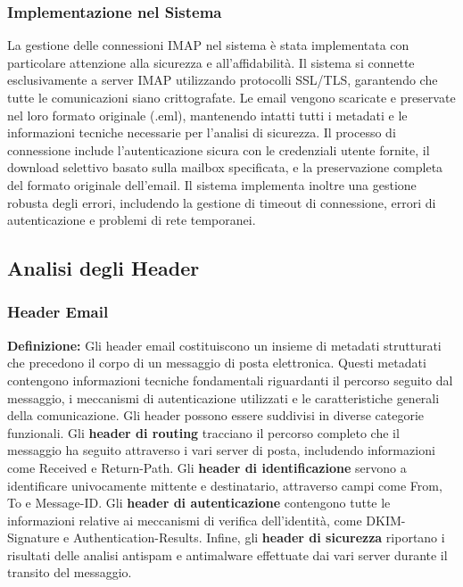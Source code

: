 \documentclass{article}
\begin{document}
\subsubsection{Implementazione nel Sistema}
La gestione delle connessioni IMAP nel sistema è stata implementata con particolare attenzione alla sicurezza e all'affidabilità. Il sistema si connette esclusivamente a server IMAP utilizzando protocolli SSL/TLS, garantendo che tutte le comunicazioni siano crittografate. Le email vengono scaricate e preservate nel loro formato originale (.eml), mantenendo intatti tutti i metadati e le informazioni tecniche necessarie per l'analisi di sicurezza.
\newline\newline
Il processo di connessione include l'autenticazione sicura con le credenziali utente fornite, il download selettivo basato sulla mailbox specificata, e la preservazione completa del formato originale dell'email. Il sistema implementa inoltre una gestione robusta degli errori, includendo la gestione di timeout di connessione, errori di autenticazione e problemi di rete temporanei.

\subsection{Analisi degli Header}

\subsubsection{Header Email}
\textbf{Definizione:} Gli header email costituiscono un insieme di metadati strutturati che precedono il corpo di un messaggio di posta elettronica. Questi metadati contengono informazioni tecniche fondamentali riguardanti il percorso seguito dal messaggio, i meccanismi di autenticazione utilizzati e le caratteristiche generali della comunicazione.
\newline \newline
Gli header possono essere suddivisi in diverse categorie funzionali. Gli \textbf{header di routing} tracciano il percorso completo che il messaggio ha seguito attraverso i vari server di posta, includendo informazioni come Received e Return-Path. Gli \textbf{header di identificazione} servono a identificare univocamente mittente e destinatario, attraverso campi come From, To e Message-ID. Gli \textbf{header di autenticazione} contengono tutte le informazioni relative ai meccanismi di verifica dell'identità, come DKIM-Signature e Authentication-Results. Infine, gli \textbf{header di sicurezza} riportano i risultati delle analisi antispam e antimalware effettuate dai vari server durante il transito del messaggio.
\end{document}
